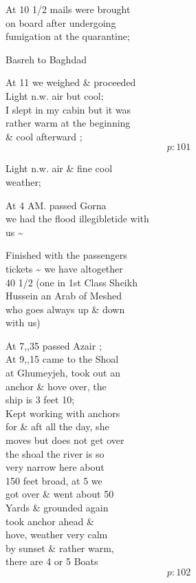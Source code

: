 \documentclass{report}
\begin{document}
	\par{
 	At 10 1/2 mails were brought\ \\on board after undergoing\ \\fumigation at the quarantine;\ \\
	}

	\par{
 	Basreh to Baghdad\ \\
	}

	\par{
 	At 11 we weighed \& proceeded\ \\Light n.w. air but cool;\ \\I slept in my cabin but it was\ \\rather warm at the beginning\ \\\& cool afterward ;\ \\
  \[p: 101 \]

	}


	\par{
 	Light n.w. air \& fine cool\ \\weather;\ \\
	}

	\par{
 	At 4 AM. passed Gorna\ \\we had the flood \lbrack illegible\rbrack tide with\ \\us \~{}\ \\
	}

	\par{
 	Finished with the passengers\ \\tickets \~{} we have altogether\ \\40 1/2 (one in 1st Class Sheikh\ \\Hussein an Arab of Meshed\ \\who goes always up \& down\ \\with us)\ \\
	}

	\par{
 	At 7,,35 passed Azair ;\ \\At 9,,15 came to the Shoal\ \\at Ghumeyjeh, took out an\ \\anchor \& hove over, the\ \\ship is 3 feet 10;\ \\Kept working with anchors\ \\for \& aft all the day, she\ \\moves but does not get over\ \\the shoal the river is so\ \\very narrow here about\ \\150 feet broad, at 5 we\ \\got over \& went about 50\ \\Yards \& grounded again\ \\took anchor ahead \&\ \\hove, weather very calm\ \\by sunset \& rather warm,\ \\there are 4 or 5 Boats\ \\
  \[p: 102 \]

	}
\end{document}

